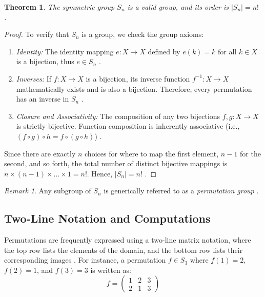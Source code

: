 \documentclass[11pt]{article}
\theoremstyle{definition}
\theoremstyle{plain}
\newtheorem{theorem}{Theorem}[section]
\theoremstyle{remark}
\newtheorem*{remark}{Remark}
\begin{document}
\begin{theorem}
The symmetric group $S_n$ is a valid group, and its order is $|S_n| = n!$ \cite{fraleigh}.
\end{theorem}

\begin{proof}
To verify that $S_n$ is a group, we check the group axioms:
\begin{enumerate}
    \item \emph{Identity:} The identity mapping $e: X \rightarrow X$ defined by $e(k) = k$ for all $k \in X$ is a bijection, thus $e \in S_n$ \cite{dummit}.
    \item \emph{Inverses:} If $f: X \rightarrow X$ is a bijection, its inverse function $f^{-1}: X \rightarrow X$ mathematically exists and is also a bijection. Therefore, every permutation has an inverse in $S_n$ \cite{fraleigh}.
    \item \emph{Closure and Associativity:} The composition of any two bijections $f, g: X \rightarrow X$ is strictly bijective. Function composition is inherently associative (i.e., $(f \circ g) \circ h = f \circ (g \circ h)$) \cite{gallian}.
\end{enumerate}
Since there are exactly $n$ choices for where to map the first element, $n-1$ for the second, and so forth, the total number of distinct bijective mappings is $n \times (n-1) \times \dots \times 1 = n!$. Hence, $|S_n| = n!$ \cite{dummit}.
\end{proof}

\begin{remark}
Any subgroup of $S_n$ is generically referred to as a \emph{permutation group} \cite{gallian}.
\end{remark}

\subsection{Two-Line Notation and Computations}

Permutations are frequently expressed using a two-line matrix notation, where the top row lists the elements of the domain, and the bottom row lists their corresponding images \cite{dummit}. For instance, a permutation $f \in S_3$ where $f(1)=2$, $f(2)=1$, and $f(3)=3$ is written as:
\begin{equation}
    f = \begin{pmatrix} 1 & 2 & 3 \\ 2 & 1 & 3 \end{pmatrix}
\end{equation}
\end{document}
